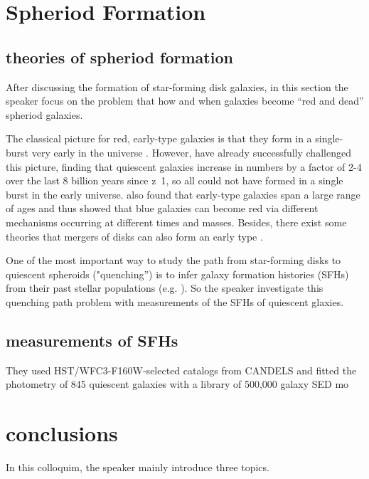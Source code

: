\documentclass[modern]{aastex63}
\begin{document}
\bigskip
\bigskip
\section{Spheriod Formation}\label{sph}

\subsection{theories of spheriod formation}
After discussing the formation of star-forming disk galaxies, in this section the speaker focus on the problem that how and when galaxies become “red and dead” spheriod galaxies.

The classical picture for red, early-type galaxies is that they form in a single-burst very early in the universe \citep{1975MNRAS.173..671L}. However, \citet{1995IAUS..164..249F} have already successfully challenged this picture, finding that quiescent galaxies increase in numbers by a factor of 2-4 over the last 8 billion years since z~1, so all could not have formed in a single burst in the early universe. \citet{2000AJ....119.1645T} also found that early-type galaxies span a large range of ages and thus showed that blue galaxies can become red via different mechanisms occurring at different times and masses. Besides, there exist some theories that mergers of disks can also form an early type \citep{1977egsp.conf..401T}. 

One of the most important way to study the path from star-forming disks to quiescent spheroids ("quenching”) is to infer galaxy formation histories (SFHs) from their past stellar populations (e.g. \citealt{2015MNRAS.448.3484M}). So the speaker investigate this quenching path problem with measurements of the SFHs of quiescent glaxies. \citep{2016ApJ...832...79P}

\subsection{measurements of SFHs}
They used HST/WFC3-F160W-selected catalogs from CANDELS \citep{2011ApJS..197...36K} and fitted the photometry of 845 quiescent galaxies with a library of 500,000 galaxy SED mo



\section{conclusions}\label{con}
In this colloquim, the speaker mainly introduce three topics.
\end{document}
